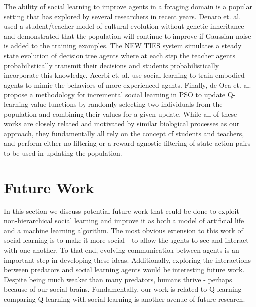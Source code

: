 \documentclass{acm_proc_article-sp}
\begin{document}
The ability of social learning to improve agents in a foraging domain is a popular setting that has explored by several researchers in recent years. Denaro et. al. \cite{denaro1996cultural} used a student/teacher model of cultural evolution without genetic inheritance and demonstrated that the population will continue to improve if Gaussian noise is added to the training examples. The NEW TIES system \cite{haasdijk2008social, vogt2010modeling} simulates a steady state evolution of decision tree agents where at each step the teacher agents probabilistically transmit their decisions and students probabilistically incorporate this knowledge. Acerbi et. al. \cite{acerbi2007social} use social learning to train embodied agents to mimic the behaviors of more experienced agents. Finally, de Oca et. al. \cite{de2011incremental} propose a methodology for incremental social learning in PSO to update Q-learning \cite{watkins1992q} value functions by randomly selecting two individuals from the population and combining their values for a given update. While all of these works are closely related and motivated by similar biological processes as our approach, they fundamentally all rely on the concept of students and teachers, and perform either no filtering or a reward-agnostic filtering of state-action pairs to be used in updating the population.

\section{Future Work}
\label{sec:future}

In this section we discuss potential future work that could be done to exploit non-hierarchical social learning and improve it as both a model of artificial life and a machine learning algorithm.
The most obvious extension to this work of social learning is to make it more social - to allow the agents to see and interact with one another.
To that end, evolving communication between agents is an important step in developing these ideas. 
Additionally, exploring the interactions between predators and social learning agents would be interesting future work. Despite being much weaker than many predators, humans thrive - perhaps because of our social brains.
Fundamentally, our work is related to Q-learning - comparing Q-learning with social learning is another avenue of future research.


\end{document}
